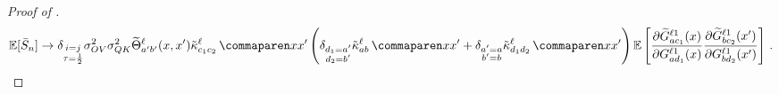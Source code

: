 \begin{proof}[Proof of ]
    \begin{align*}
        \E [\generalMean_{\sequenceVariable}]
        \to
        \delta_{\substack{i = j \\ \scaling = \frac{1}{2}}}
        \OVVar
        \QKVar
        \ntktilde_{\gIndexA \gIndexB}^{\depthSymbol}(\inputSymbol, \inputSymbol')
        \kerntildef{c_1 c_2}{\depthSymbol}{\inputSymbol}{\inputSymbol'}
        \left( 
            \delta_{\substack{d_1 = \gIndexA \\ d_2 = \gIndexB}}
            \kerntildef{\fIndexA \fIndexB}{\depthSymbol}{\inputSymbol}{\inputSymbol'}
            +
            \delta_{\substack{\gIndexA = \fIndexA \\ \gIndexB = \fIndexB}}
            \kerntildef{d_1 d_2}{\depthSymbol}{\inputSymbol}{\inputSymbol'}
        \right)
        \E \left[
            \frac{
                \partial
                \tildeLogit{\fIndexA c_1}{\depthSymbol 1} (\inputSymbol)
            }{
                \partial 
                \logitSymbol_{\fIndexA d_1}^{\depthSymbol 1} (\inputSymbol)
            }
            \frac{
                \partial
                \tildeLogit{\fIndexB c_2}{\depthSymbol 1} (\inputSymbol')
            }{
                \partial 
                \logitSymbol_{\fIndexB d_2}^{\depthSymbol 1} (\inputSymbol')
            }
        \right]
        \, .
    \end{align*}
    

\end{proof}
